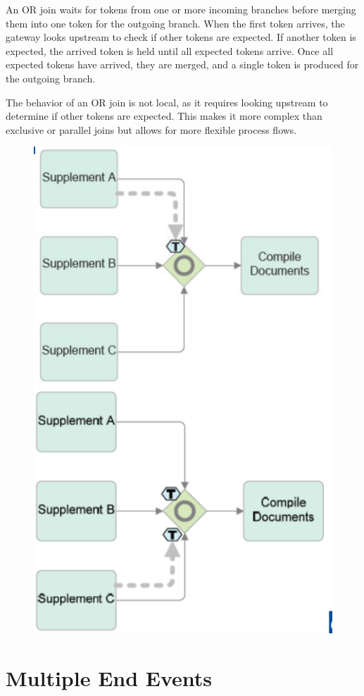 An OR join waits for tokens from one or more incoming branches before merging them into one token for the outgoing branch. When the first token arrives, the gateway looks upstream to check if other tokens are expected. If another token is expected, the arrived token is held until all expected tokens arrive. Once all expected tokens have arrived, they are merged, and a single token is produced for the outgoing branch.

The behavior of an OR join is not local, as it requires looking upstream to determine if other tokens are expected. This makes it more complex than exclusive or parallel joins but allows for more flexible process flows.
\begin{figure}[h!]
    \centering
    \includegraphics[width=0.75\linewidth]{capitolo 9/10.png}
\end{figure}
\section{Multiple End Events}

